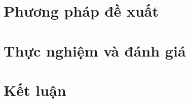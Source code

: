 \documentclass[a4paper,13pt]{report}
\begin{document}
\label{chapter-3}
\chapter{Phương pháp đề xuất}

\cleardoublepage

\label{chapter-4}
\chapter{Thực nghiệm và đánh giá}

\cleardoublepage

\label{chapter-5}
\chapter{Kết luận}


\newpage\cleardoublepage




\clearpage

{}

\end{document}
